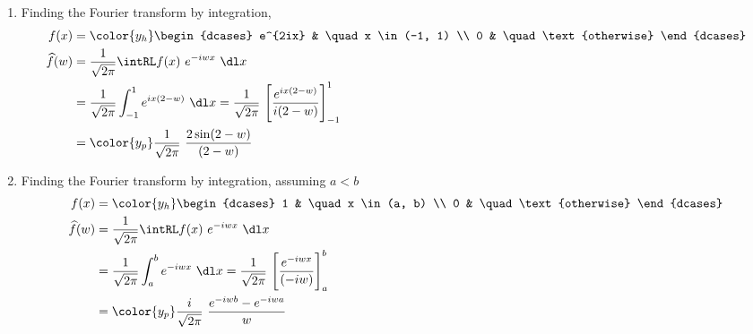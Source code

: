 \begin{enumerate}
    \item Finding the Fourier transform by integration,
          \begin{align}
              f(x)           & = \color{y_h}\begin{dcases}
                                                e^{2ix} & \quad x \in (-1, 1)    \\
                                                0       & \quad \text{otherwise}
                                            \end{dcases}          \\
              \widehat{f}(w) & = \frac{1}{\sqrt{2\pi}} \intRL f(x)\ e^{-iwx}\ \dl x   \\
                             & = \frac{1}{\sqrt{2\pi}} \int_{-1}^{1} e^{ix(2-w)}
              \ \dl x
              = \frac{1}{\sqrt{2\pi}}\ \Bigg[ \frac{e^{ix (2-w)}}{i(2-w)}
              \Bigg]_{-1}^{1}                                                         \\
                             & = \color{y_p} \frac{1}{\sqrt{2\pi}}\ \frac{2\sin(2-w)}
              {(2-w)}
          \end{align}

    \item Finding the Fourier transform by integration, assuming $ a<b $
          \begin{align}
              f(x)           & = \color{y_h}\begin{dcases}
                                                1 & \quad x \in (a, b)     \\
                                                0 & \quad \text{otherwise}
                                            \end{dcases}              \\
              \widehat{f}(w) & = \frac{1}{\sqrt{2\pi}} \intRL f(x)\ e^{-iwx}\ \dl x \\
                             & = \frac{1}{\sqrt{2\pi}} \int_{a}^{b} e^{-iwx}
              \ \dl x
              = \frac{1}{\sqrt{2\pi}}\ \Bigg[ \frac{e^{-iwx}}{(-iw)} \Bigg]_{a}^{b} \\
                             & = \color{y_p} \frac{i}{\sqrt{2\pi}}\ \frac{e^{-iwb}
                  - e^{-iwa}}{w}
          \end{align}


\end{enumerate}
